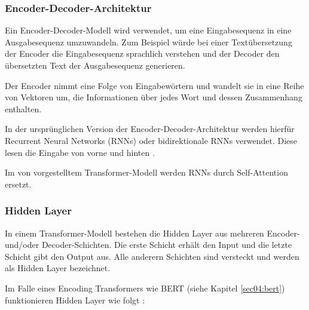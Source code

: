 \subsubsection{Encoder-Decoder-Architektur} \label{sec:encoder_decoder_architecture}

Ein Encoder-Decoder-Modell wird verwendet, um eine Eingabesequenz in eine Ausgabesequenz umzuwandeln. 
Zum Beispiel würde bei einer Textübersetzung der Encoder die Eingabesequenz sprachlich verstehen und der Decoder den übersetzten Text der Ausgabesequenz generieren.

Der Encoder nimmt eine Folge von Eingabewörtern und wandelt sie in eine Reihe von Vektoren um, die Informationen über jedes Wort und dessen Zusammenhang enthalten.

In der ursprünglichen Version der Encoder-Decoder-Architektur werden hierfür Recurrent Neural Networks (RNNs) oder bidirektionale RNNs verwendet.
Diese lesen die Eingabe von vorne und hinten \cite{bahdanau2016neuralmachinetranslationjointly}.

Im von \cite{vaswani2023attentionneed} vorgestelltem Transformer-Modell werden RNNs durch Self-Attention ersetzt. 


\subsubsection{Hidden Layer} \label{sec:hidden_layer}

In einem Transformer-Modell \cite{vaswani2023attentionneed} bestehen die Hidden Layer aus mehreren Encoder- und/oder Decoder-Schichten.
Die erste Schicht erhält den Input und die letzte Schicht gibt den Output aus. Alle anderern Schichten sind versteckt und werden
als Hidden Layer bezeichnet.

Im Falle eines Encoding Transformers wie BERT (siehe Kapitel \ref{sec04:bert}) funktionieren Hidden Layer wie folgt \cite{DBLP:journals/corr/abs-1810-04805}:

